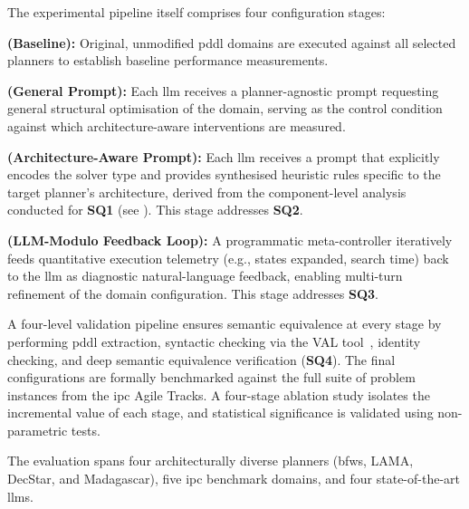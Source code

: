 The experimental pipeline itself comprises four configuration stages:

\begin{description}[style=nextline, leftmargin=2.5cm, labelwidth=2.2cm]
  \item[\textbf{Stage~0}] \textbf{(Baseline):}
        Original, unmodified \gls{pddl} domains are executed against all selected planners to establish baseline performance measurements.

  \item[\textbf{Stage~1}] \textbf{(General Prompt):}
        Each \gls{llm} receives a planner-agnostic prompt requesting general structural optimisation of the domain, serving as the control condition against which architecture-aware interventions are measured.

  \item[\textbf{Stage~2}] \textbf{(Architecture-Aware Prompt):}
        Each \gls{llm} receives a prompt that explicitly encodes the solver type and provides synthesised heuristic rules specific to the target planner's architecture, derived from the component-level analysis conducted for \textbf{SQ1} (see ).
        This stage addresses \textbf{SQ2}.

  \item[\textbf{Stage~3}] \textbf{(LLM-Modulo Feedback Loop):}
        A programmatic meta-controller iteratively feeds quantitative execution telemetry (e.g., states expanded, search time) back to the \gls{llm} as diagnostic natural-language feedback, enabling multi-turn refinement of the domain configuration.
        This stage addresses \textbf{SQ3}.
\end{description}

A four-level validation pipeline ensures semantic equivalence at every stage by performing \gls{pddl} extraction, syntactic checking via the VAL tool~\cite{HoweyLongFox2004}, identity checking, and deep semantic equivalence verification (\textbf{SQ4}).
The final configurations are formally benchmarked against the full suite of problem instances from the \gls{ipc} Agile Tracks.
A four-stage ablation study isolates the incremental value of each stage, and statistical significance is validated using non-parametric tests.

The evaluation spans four architecturally diverse planners (\gls{bfws}, LAMA, DecStar, and Madagascar), five \gls{ipc} benchmark domains, and four state-of-the-art \glspl{llm}.

